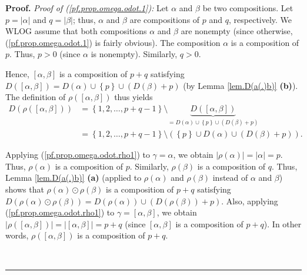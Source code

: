 \documentclass
[numbers=enddot,12pt,final,onecolumn,notitlepage,abstracton]{scrartcl}%
\theoremstyle{definition}
\newenvironment{proof}[1][Proof]{\noindent\textbf{#1.} }{\ \rule{0.5em}{0.5em}}
\newenvironment{verlong}{}{}
\begin{document}
\begin{verlong}
\begin{proof}
\textit{Proof of (\ref{pf.prop.omega.odot.1}):} Let $\alpha$ and $\beta$ be
two compositions. Let $p=\left\vert \alpha\right\vert $ and $q=\left\vert
\beta\right\vert $; thus, $\alpha$ and $\beta$ are compositions of $p$ and
$q$, respectively. We WLOG assume that both compositions $\alpha$ and $\beta$
are nonempty (since otherwise, (\ref{pf.prop.omega.odot.1}) is fairly
obvious). The composition $\alpha$ is a composition of $p$. Thus, $p > 0$
(since $\alpha$ is nonempty). Similarly, $q > 0$.

Hence, $\left[  \alpha,\beta\right]  $ is a composition of $p+q$ satisfying
$D\left(  \left[  \alpha,\beta\right]  \right)  =D\left(  \alpha\right)
\cup\left\{  p\right\}  \cup\left(  D\left(  \beta\right)  +p\right)  $ (by
Lemma \ref{lem.D(a(.)b)} \textbf{(b)}). The definition of $\rho\left(  \left[
\alpha,\beta\right]  \right)  $ thus yields%
\begin{align}
D\left(  \rho\left(  \left[  \alpha,\beta\right]  \right)  \right)   &
=\left\{  1,2,\ldots,p+q-1\right\}  \setminus\underbrace{D\left(  \left[
\alpha,\beta\right]  \right)  }_{=D\left(  \alpha\right)  \cup\left\{
p\right\}  \cup\left(  D\left(  \beta\right)  +p\right)  }\nonumber\\
&  =\left\{  1,2,\ldots,p+q-1\right\}  \setminus\left(  \left\{  p\right\}
\cup D\left(  \alpha\right)  \cup\left(  D\left(  \beta\right)  +p\right)
\right)  . \label{pf.prop.omega.odot.1.pf.1}%
\end{align}


Applying (\ref{pf.prop.omega.odot.rho1}) to $\gamma=\alpha$, we obtain
$\left\vert \rho\left(  \alpha\right)  \right\vert =\left\vert \alpha
\right\vert =p$. Thus, $\rho\left(  \alpha\right)  $ is a composition of $p$.
Similarly, $\rho\left(  \beta\right)  $ is a composition of $q$. Thus, Lemma
\ref{lem.D(a(.)b)} \textbf{(a)} (applied to $\rho\left(  \alpha\right)  $ and
$\rho\left(  \beta\right)  $ instead of $\alpha$ and $\beta$) shows that
$\rho\left(  \alpha\right)  \odot\rho\left(  \beta\right)  $ is a composition
of $p+q$ satisfying $D\left(  \rho\left(  \alpha\right)  \odot\rho\left(
\beta\right)  \right)  =D\left(  \rho\left(  \alpha\right)  \right)
\cup\left(  D\left(  \rho\left(  \beta\right)  \right)  +p\right)  $. Also,
applying (\ref{pf.prop.omega.odot.rho1}) to $\gamma=\left[  \alpha
,\beta\right]  $, we obtain $\left|  \rho\left(  \left[  \alpha,\beta\right]
\right)  \right|  = \left|  \left[  \alpha,\beta\right]  \right|  = p+q$
(since $\left[  \alpha,\beta\right]  $ is a composition of $p+q$). In other
words, $\rho\left(  \left[  \alpha,\beta\right]  \right)  $ is a composition
of $p+q$.


\end{proof}
\end{verlong}
\end{document}
